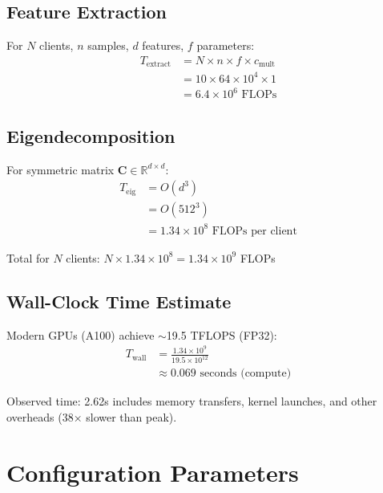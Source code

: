 \documentclass[11pt,a4paper]{article}
\begin{document}
\subsection{Feature Extraction}

For $N$ clients, $n$ samples, $d$ features, $f$ parameters:
\begin{align}
T_{\text{extract}} &= N \times n \times f \times c_{\text{mult}} \\
&= 10 \times 64 \times 10^4 \times 1 \\
&= 6.4 \times 10^6 \text{ FLOPs}
\end{align}

\subsection{Eigendecomposition}

For symmetric matrix $\mathbf{C} \in \mathbb{R}^{d \times d}$:
\begin{align}
T_{\text{eig}} &= O(d^3) \\
&= O(512^3) \\
&= 1.34 \times 10^8 \text{ FLOPs per client}
\end{align}

Total for $N$ clients: $N \times 1.34 \times 10^8 = 1.34 \times 10^9$ FLOPs

\subsection{Wall-Clock Time Estimate}

Modern GPUs (A100) achieve $\sim$19.5 TFLOPS (FP32):
\begin{align}
T_{\text{wall}} &= \frac{1.34 \times 10^9}{19.5 \times 10^{12}} \\
&\approx 0.069 \text{ seconds (compute)}
\end{align}

Observed time: 2.62s includes memory transfers, kernel launches, and other overheads (38× slower than peak).

\section{Configuration Parameters}
\end{document}
